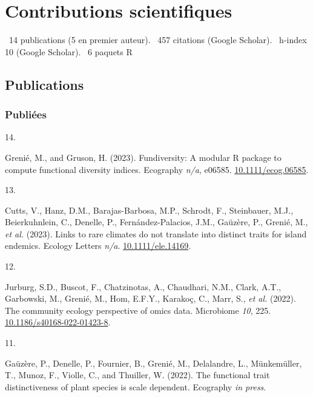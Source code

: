 \documentclass[10pt,a4paper,]{article}
\newlength{\cslhangindent}
\newlength{\csllabelwidth}
\newcommand{\CSLLeftMargin}[1]{\parbox[t]{\csllabelwidth}{\hfill #1~}}
\newcommand{\CSLRightInline}[1]{\parbox[t]{\linewidth - \cslhangindent - \csllabelwidth}{#1}\vspace{0.8ex}}
\begin{document}
\hypertarget{contributions-scientifiques}{%
\section{Contributions
scientifiques}\label{contributions-scientifiques}}

\faFile*~14 publications (5 en premier auteur). \faQuoteLeft~457
citations (Google Scholar). \faHSquare~h-index 10 (Google Scholar).
\faRProject~6 paquets R

\hypertarget{publications}{%
\subsection{Publications}\label{publications}}

\hypertarget{publiuxe9es}{%
\subsubsection{Publiées}\label{publiuxe9es}}

\hypertarget{bibliography}{}
\leavevmode{}%
\CSLLeftMargin{14. }%
\CSLRightInline{Grenié, M., and Gruson, H. (2023). Fundiversity: A
modular R package to compute functional diversity indices. Ecography
\emph{n/a}, e06585.
\href{https://doi.org/10.1111/ecog.06585}{10.1111/ecog.06585}.}

\leavevmode{}%
\CSLLeftMargin{13. }%
\CSLRightInline{Cutts, V., Hanz, D.M., Barajas-Barbosa, M.P., Schrodt,
F., Steinbauer, M.J., Beierkuhnlein, C., Denelle, P.,
Fernández-Palacios, J.M., Gaüzère, P., Grenié, M., \emph{et al.} (2023).
Links to rare climates do not translate into distinct traits for island
endemics. Ecology Letters \emph{n/a}.
\href{https://doi.org/10.1111/ele.14169}{10.1111/ele.14169}.}

\leavevmode{}%
\CSLLeftMargin{12. }%
\CSLRightInline{Jurburg, S.D., Buscot, F., Chatzinotas, A., Chaudhari,
N.M., Clark, A.T., Garbowski, M., Grenié, M., Hom, E.F.Y., Karakoç, C.,
Marr, S., \emph{et al.} (2022). The community ecology perspective of
omics data. Microbiome \emph{10}, 225.
\href{https://doi.org/10.1186/s40168-022-01423-8}{10.1186/s40168-022-01423-8}.}

\leavevmode{}%
\CSLLeftMargin{11. }%
\CSLRightInline{Gaüzère, P., Denelle, P., Fournier, B., Grenié, M.,
Delalandre, L., Münkemüller, T., Munoz, F., Violle, C., and Thuiller, W.
(2022). The functional trait distinctiveness of plant species is scale
dependent. Ecography \emph{in press}.}
\end{document}
